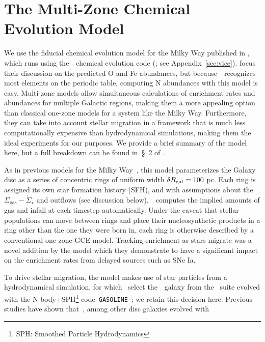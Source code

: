 \documentclass[ms.tex]{subfiles}
\begin{document}
\section{The Multi-Zone Chemical Evolution Model}
\label{sec:multizone}

We use the fiducial chemical evolution model for the Milky Way published in
\citet{Johnson2021}, which runs using the~\vice~chemical evolution code
(\citealp{Johnson2020, Griffith2021}; see Appendix~\ref{sec:vice}).
\citet{Johnson2021} focus their discussion on the predicted O and Fe
abundances, but because~\vice~recognizes most elements on the periodic table,
computing N abundances with this model is easy.
Multi-zone models allow simultaneous calculations of enrichment rates and
abundances for multiple Galactic regions, making them a more appealing option
than classical one-zone models for a system like the Milky Way.
Furthermore, they can take into account stellar migration in a framework that
is much less computationally expensive than hydrodynamical simulations, making
them the ideal experiments for our purposes.
We provide a brief summary of the model here, but a full breakdown can be found
in~\S~2 of~\citet{Johnson2021}.
\par
As in previous models for the Milky Way~\citep[e.g.][]{Matteucci1989,
Schoenrich2009, Minchev2013, Minchev2014, Minchev2017, Sharma2020}, this model
parameterizes the Galaxy disc as a series of concentric rings of uniform width
$\delta R_\text{gal} = 100$ pc.
Each ring is assigned its own star formation history (SFH), and with
assumptions about the~$\Sigma_\text{gas}-\dot{\Sigma}_\star$ and outflows (see
discussion below),~\vice~computes the implied amounts of gas and infall at each
timestep automatically.
Under the caveat that stellar populations can move between rings and place
their nucleosynthetic products in a ring other than the one they were born in,
each ring is otherwise described by a conventional one-zone GCE model.
Tracking enrichment as stars migrate was a novel addition by the
\citet{Johnson2021} model which they demonstrate to have a significant impact
on the enrichment rates from delayed sources such as SNe Ia.
\par
To drive stellar migration, the model makes use of star particles from a
hydrodynamical simulation, for which~\citet{Johnson2021} select the~\hsim~galaxy
from the~\citet{Christensen2012} suite evolved with the N-body+SPH\footnote{
	SPH: Smoothed Particle Hydrodynamics
} code~\texttt{GASOLINE}~\citep{Wadsley2004}; we retain this decision here.
Previous studies have shown that~\hsim, among other disc galaxies evolved with
\end{document}
